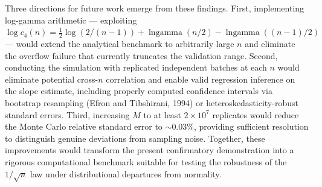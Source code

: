 \documentclass[11pt]{article}
\begin{document}
Three directions for future work emerge from these findings. First, implementing log-gamma arithmetic — exploiting $\log c_4(n) = \tfrac{1}{2}\log(2/(n-1)) + \operatorname{lngamma}(n/2) - \operatorname{lngamma}((n-1)/2)$ — would extend the analytical benchmark to arbitrarily large $n$ and eliminate the overflow failure that currently truncates the validation range. Second, conducting the simulation with replicated independent batches at each $n$ would eliminate potential cross-$n$ correlation and enable valid regression inference on the slope estimate, including properly computed confidence intervals via bootstrap resampling (Efron and Tibshirani, 1994) or heteroskedasticity-robust standard errors. Third, increasing $M$ to at least $2 \times 10^7$ replicates would reduce the Monte Carlo relative standard error to $\sim 0.03\%$, providing sufficient resolution to distinguish genuine deviations from sampling noise. Together, these improvements would transform the present confirmatory demonstration into a rigorous computational benchmark suitable for testing the robustness of the $1/\sqrt{n}$ law under distributional departures from normality.
\end{document}
